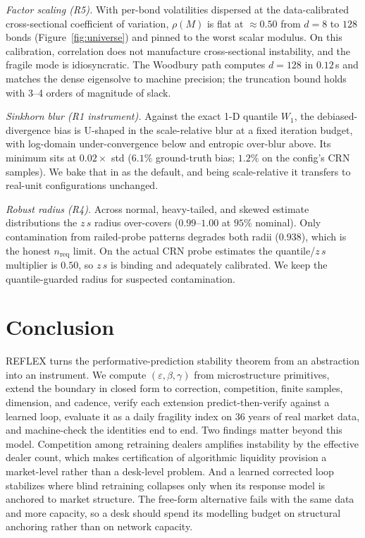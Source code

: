 \documentclass[sigconf]{acmart}
\newcommand{\eps}{\varepsilon}
\newcommand{\Wone}{W_1}
\begin{document}
\emph{Factor scaling (R5).} With per-bond volatilities dispersed at the
data-calibrated cross-sectional coefficient of variation, $\rho(M)$ is flat
at ${\approx}0.50$ from $d=8$ to $128$ bonds (Figure~\ref{fig:universe}) and
pinned to the worst scalar modulus. On this calibration, correlation does
not manufacture cross-sectional instability, and the fragile mode is
idiosyncratic. The Woodbury path computes $d=128$ in $0.12$\,s and matches
the dense eigensolve to machine precision; the truncation bound holds with
3--4 orders of magnitude of slack.

\emph{Sinkhorn blur (R1 instrument).} Against the exact 1-D quantile
$\Wone$, the debiased-divergence bias is U-shaped in the scale-relative blur
at a fixed iteration budget, with log-domain under-convergence below and
entropic over-blur above. Its minimum sits at $0.02\times$ std ($6.1\%$
ground-truth bias; $1.2\%$ on the config's CRN samples). We bake that in as
the default, and being scale-relative it transfers to real-unit
configurations unchanged.

\emph{Robust radius (R4).} Across normal, heavy-tailed, and skewed estimate
distributions the $z\,s$ radius over-covers ($0.99$--$1.00$ at $95\%$
nominal). Only contamination from railed-probe patterns degrades both radii
($0.938$), which is the honest $n_{\mathrm{req}}$ limit. On the actual CRN
probe estimates the quantile/$z\,s$ multiplier is $0.50$, so $z\,s$ is
binding and adequately calibrated. We keep the quantile-guarded radius for
suspected contamination.

\section{Conclusion}
REFLEX turns the performative-prediction stability theorem from an
abstraction into an instrument. We compute $(\eps,\beta,\gamma)$ from
microstructure primitives, extend the boundary in closed form to correction,
competition, finite samples, dimension, and cadence, verify each extension
predict-then-verify against a learned loop, evaluate it as a daily fragility
index on 36 years of real market data, and machine-check the identities end
to end. Two findings matter beyond this model. Competition among retraining
dealers amplifies instability by the effective dealer count, which makes
certification of algorithmic liquidity provision a market-level rather than
a desk-level problem. And a learned corrected loop stabilizes where blind
retraining collapses only when its response model is anchored to market
structure. The free-form alternative fails with the same data and more
capacity, so a desk should spend its modelling budget on structural
anchoring rather than on network capacity.
\end{document}
